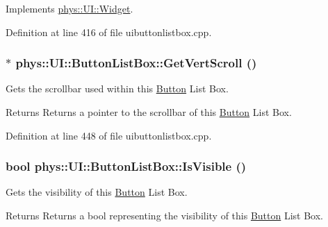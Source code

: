 Implements \hyperlink{classphys_1_1UI_1_1Widget_a07039c19e57de314147ce066417da0a2}{phys::UI::Widget}.



Definition at line 416 of file uibuttonlistbox.cpp.

\hypertarget{classphys_1_1UI_1_1ButtonListBox_ad0988e4abe0daef3b9949e42c6dfc5fd}{
\subsubsection[{GetVertScroll}]{ $\ast$ phys::UI::ButtonListBox::GetVertScroll ()}}
\label{d4/dd7/classphys_1_1UI_1_1ButtonListBox_ad0988e4abe0daef3b9949e42c6dfc5fd}


Gets the scrollbar used within this \hyperlink{classphys_1_1UI_1_1Button}{Button} List Box. 

\begin{DoxyReturn}{Returns}
Returns a pointer to the scrollbar of this \hyperlink{classphys_1_1UI_1_1Button}{Button} List Box. 
\end{DoxyReturn}


Definition at line 448 of file uibuttonlistbox.cpp.

\hypertarget{classphys_1_1UI_1_1ButtonListBox_a1282a1494079e47b48c8e3296b1a8bb0}{
\subsubsection[{IsVisible}]{\setlength{\rightskip}{0pt plus 5cm}bool phys::UI::ButtonListBox::IsVisible ()}}
\label{d4/dd7/classphys_1_1UI_1_1ButtonListBox_a1282a1494079e47b48c8e3296b1a8bb0}


Gets the visibility of this \hyperlink{classphys_1_1UI_1_1Button}{Button} List Box. 

\begin{DoxyReturn}{Returns}
Returns a bool representing the visibility of this \hyperlink{classphys_1_1UI_1_1Button}{Button} List Box. 
\end{DoxyReturn}


